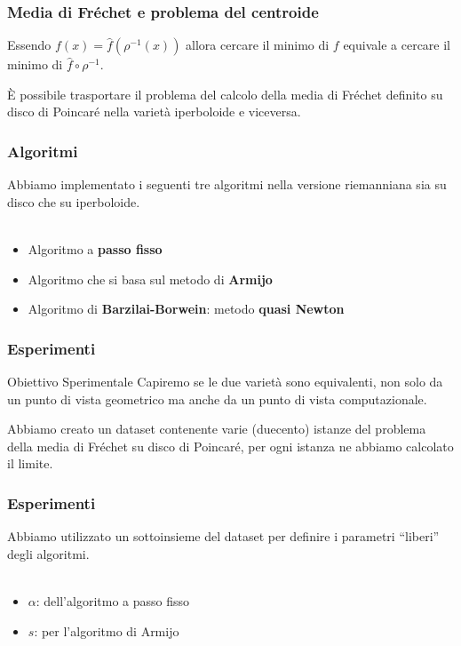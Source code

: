 \documentclass{beamer}
\begin{document}
\begin{frame}
\frametitle{Media di Fréchet e problema del centroide}
\begin{beamerboxesrounded}{}
Essendo $f (x) = \hat{f} (\rho^{-1}(x))$ allora cercare il minimo di $f$ equivale a cercare il minimo di  $\hat{f} \circ \rho^{-1}$.
\end{beamerboxesrounded}
\bigskip
\`E possibile \alert{trasportare il problema} del calcolo della media di Fréchet definito su disco di Poincaré nella varietà iperboloide e viceversa.
\end{frame}

\begin{frame}
\frametitle{Algoritmi}
Abbiamo implementato i seguenti tre algoritmi nella versione riemanniana sia su disco che su iperboloide.\\~\
\begin{itemize}
    \item Algoritmo a \textbf{passo fisso}
    \item Algoritmo che si basa sul metodo di \textbf{Armijo}
    \item Algoritmo di \textbf{Barzilai-Borwein}: metodo \textbf{quasi Newton}
\end{itemize}
\end{frame}

\begin{frame}
\frametitle{Esperimenti}
\begin{beamerboxesrounded}{Obiettivo Sperimentale}
Capiremo se le due varietà sono equivalenti, non solo da un punto di vista geometrico ma anche da un punto di vista computazionale.
\end{beamerboxesrounded}
\bigskip
Abbiamo creato un dataset contenente varie (duecento) istanze del problema della media di Fréchet su disco di Poincaré, per ogni istanza ne abbiamo calcolato il limite.
\end{frame}

\begin{frame}
\frametitle{Esperimenti}
Abbiamo utilizzato un sottoinsieme del dataset per definire i parametri “liberi” degli algoritmi.\\~\

\begin{itemize}
    \item $\alpha$: dell’algoritmo a passo fisso
    \item $s$: per l’algoritmo di Armijo
\end{itemize}
\end{frame}
\end{document}
